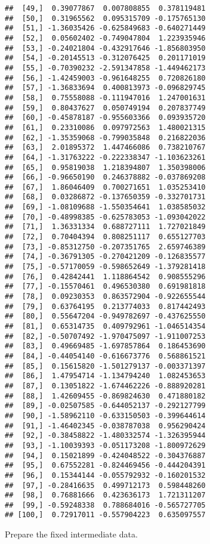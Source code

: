 \documentclass[
]{article}
\begin{document}
\begin{verbatim}
##  [49,]  0.39077867  0.007808855  0.378119481
##  [50,]  0.31965562  0.095315709 -0.175765130
##  [51,] -1.36035426 -0.625849683 -0.640271449
##  [52,]  0.05602402 -0.749047804  1.223935946
##  [53,] -0.24021804 -0.432917646 -1.856803950
##  [54,] -0.20145513 -0.312076425  0.201171019
##  [55,] -0.70390232 -2.591347858 -1.449462173
##  [56,] -1.42459003 -0.961648255  0.720826180
##  [57,] -1.36833694  0.400813973 -0.096829745
##  [58,]  0.75558088 -0.111947016  1.247001631
##  [59,]  0.80437627  0.050749194  0.207837749
##  [60,] -0.45878187 -0.955603366  0.093935720
##  [61,]  0.23310086  0.097972563  1.480021315
##  [62,] -1.35359068 -0.799035848  0.216822036
##  [63,]  2.01895372  1.447466086  0.738210767
##  [64,] -1.31763222 -0.222338347 -1.103623261
##  [65,]  0.95819038  1.218394807  1.350398006
##  [66,] -0.96650190  0.246378882 -0.037869208
##  [67,]  1.86046409  0.700271651  1.035253410
##  [68,]  0.03286872 -0.137650359 -0.332701731
##  [69,] -1.08109688 -1.550354641  1.038585032
##  [70,] -0.48998385 -0.625783053 -1.093042022
##  [71,]  1.36331334  0.688727111  1.727021849
##  [72,]  0.70404394  0.808251117  0.655127703
##  [73,] -0.85312750 -0.207351765  2.659746389
##  [74,] -0.36791305 -0.270421209 -0.126835577
##  [75,] -0.57170059 -0.598652649 -1.379281418
##  [76,]  0.42842441  1.118864542  0.908555296
##  [77,] -0.15570461  0.496530380  0.691981818
##  [78,]  0.09230353  0.863572904 -0.922655544
##  [79,]  0.63764195  0.213774033  0.817442493
##  [80,]  0.55647204 -0.949782697 -0.437625550
##  [81,]  0.65314735  0.409792961 -1.046514354
##  [82,] -0.50707492 -1.970475097 -1.911007253
##  [83,]  0.49669485 -1.697857864  0.186453690
##  [84,] -0.44054140 -0.616673776  0.568861521
##  [85,]  0.15615820 -1.501279137 -0.003371397
##  [86,]  1.47954714 -1.134794240  1.082453653
##  [87,]  0.13051822 -1.674462226 -0.888920281
##  [88,]  1.42609455 -0.869824630  0.471880182
##  [89,] -0.02507585 -0.644052137 -0.292127799
##  [90,] -1.58962110 -0.633150503 -0.399644614
##  [91,] -1.46402345 -0.038787038  0.956290424
##  [92,] -0.38458822 -1.480332574 -1.326395944
##  [93,] -1.10039393 -0.051173208 -1.800972629
##  [94,]  0.15021899 -0.424048522 -0.304376887
##  [95,]  0.67552281 -0.824469456 -0.444204391
##  [96,]  0.15344144 -0.055792932 -0.160201532
##  [97,] -0.28416635  0.499712173  0.598448260
##  [98,]  0.76881666  0.423636173  1.721311207
##  [99,] -0.59248338  0.788684016 -0.565727705
## [100,]  0.72917011 -0.557904223  0.635097557
\end{verbatim}

Prepare the fixed intermediate data.
\end{document}
